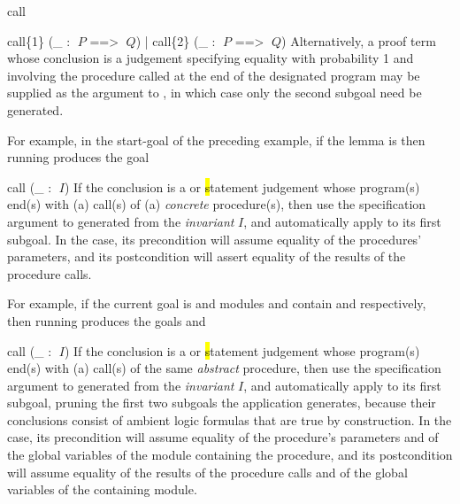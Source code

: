 \begin{tactic}{call}
\begin{tsyntax}{call\{1\} (_ : $\;P$ ==> $\;Q$) | call\{2\} (_ : $\;P$ ==> $\;Q$)}
  \bigskip Alternatively, a proof term whose conclusion is a \phl
  judgement specifying equality with probability 1 and involving the
  procedure called at the end of the designated program may be
  supplied as the argument to , in which case only the second
  subgoal need be generated.

  \medskip
  For example, in the start-goal of the preceding example,
  if the lemma  is
  then running
   produces the
  goal 
  \end{tsyntax}

  \begin{tsyntax}{call (_ : $\;I$)}
    If the conclusion is a \prhl or \hl statement judgement whose
    program(s) end(s) with (a) call(s) of (a) \emph{concrete}
    procedure(s), then use the specification argument to 
    generated from the \emph{invariant} $I$, and automatically apply
     to its first subgoal.  In the \prhl case, its
    precondition will assume equality of the procedures' parameters,
    and its postcondition will assert equality of the results of the
    procedure calls.

    \medskip
    For example, if the current goal is
    and modules  and  contain
     and
    respectively, then
    running 
    produces the goals
     and
  \end{tsyntax}

  \begin{tsyntax}{call (_ : $\;I$)}
    If the conclusion is a \prhl or \hl statement judgement whose
    program(s) end(s) with (a) call(s) of the same \emph{abstract}
    procedure, then use the specification argument to 
    generated from the \emph{invariant} $I$, and automatically apply
     to its first subgoal, pruning the first two
    subgoals the application generates, because their conclusions
    consist of ambient logic formulas that are true by construction.
    In the \prhl case, its precondition will assume equality of the
    procedure's parameters and of the global variables of the module
    containing the procedure, and its postcondition will assume
    equality of the results of the procedure calls and of the global
    variables of the containing module.


\end{tsyntax}
\end{tactic}
